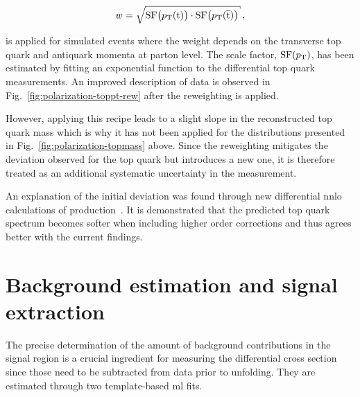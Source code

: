 \begin{equation}
w=\sqrt{\mathrm{SF}\big(\pt(\mathrm{t})\big)\cdot\mathrm{SF}\big(\pt(\bar{\mathrm{t}})\big)}\,,
\end{equation} 

is applied for simulated \ttbar events where the weight depends on the transverse top quark and antiquark momenta at parton level. The scale factor, $\mathrm{SF}(p_\mathrm{T})$, has been estimated by fitting an exponential function to the differential \ttbar top quark \pt measurements. An improved description of data is observed in Fig.~\ref{fig:polarization-toppt-rew} after the reweighting is applied.


However, applying this recipe leads to a slight slope in the reconstructed top quark mass which is why it has not been applied for the distributions presented in Fig.~\ref{fig:polarization-topmass} above. Since the reweighting mitigates the deviation observed for the top quark \pt but introduces a new one, it is therefore treated as an additional systematic uncertainty in the measurement.

An explanation of the initial deviation was found through new differential \gls{nnlo} calculations of \ttbar production~\cite{Czakon:2015owf}. It is demonstrated that the predicted top quark \pt spectrum becomes softer when including higher order corrections and thus agrees better with the current findings.


\section{Background estimation and signal extraction}
\label{sec:polarization-fit}

The precise determination of the amount of background contributions in the signal region is a crucial ingredient for measuring the differential cross section since those need to be subtracted from data prior to unfolding. They are estimated through two template-based \gls{ml} fits.

